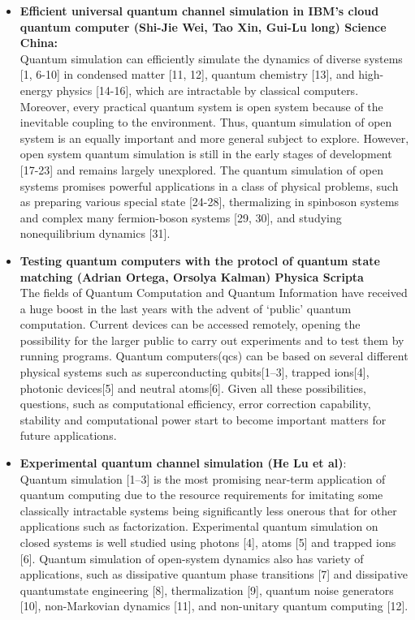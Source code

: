 \documentclass[10pt,letterpaper]{article} %
\begin{document}
\begin{itemize}
\item \textbf{Efficient universal quantum channel simulation in IBM's cloud quantum computer (Shi-Jie Wei, Tao Xin, Gui-Lu long) Science China:}\\ 

Quantum simulation can efficiently simulate the dynamics of diverse systems
[1, 6-10] in condensed matter [11, 12], quantum chemistry
[13], and high-energy physics [14-16], which are intractable
by classical computers. Moreover, every practical quantum
system is open system because of the inevitable coupling to
the environment. Thus, quantum simulation of open system
is an equally important and more general subject to explore.
However, open system quantum simulation is still in the
early stages of development [17-23] and remains largely unexplored. The quantum simulation of open systems promises
powerful applications in a class of physical problems, such as
preparing various special state [24-28], thermalizing in spinboson systems and complex many fermion-boson systems
[29, 30], and studying nonequilibrium dynamics [31]. \\

\item \textbf{Testing quantum computers with the protocl of quantum state matching (Adrian Ortega, Orsolya Kalman) Physica Scripta} \\

The fields of Quantum Computation and Quantum Information have received a huge boost in the last years with
the advent of ‘public’ quantum computation. Current devices can be accessed remotely, opening the possibility
for the larger public to carry out experiments and to test them by running programs. Quantum computers(qcs)
can be based on several different physical systems such as superconducting qubits[1–3], trapped ions[4],
photonic devices[5] and neutral atoms[6]. Given all these possibilities, questions, such as computational
efficiency, error correction capability, stability and computational power start to become important matters for
future applications.\\

\item \textbf{Experimental quantum channel simulation (He Lu et al)}: \\

Quantum simulation [1–3] is the most promising near-term
application of quantum computing due to the resource requirements for imitating some classically intractable systems
being significantly less onerous that for other applications
such as factorization. Experimental quantum simulation on
closed systems is well studied using photons [4], atoms [5]
and trapped ions [6]. Quantum simulation of open-system
dynamics also has variety of applications, such as dissipative quantum phase transitions [7] and dissipative quantumstate engineering [8], thermalization [9], quantum noise generators [10], non-Markovian dynamics [11], and non-unitary
quantum computing [12].


\end{itemize}
\end{document}
